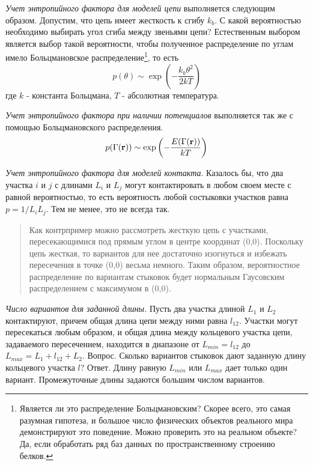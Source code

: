 \documentclass[tikz,a4paper]{scrartcl} %
\begin{document}
\textit{Учет энтропийного фактора для моделей цепи} выполняется следующим образом. Допустим, что цепь имеет жесткость к сгибу $k_b$. С какой вероятностью необходимо выбирать угол сгиба между звеньями цепи? Естественным выбором является выбор такой вероятности, чтобы полученное распределение по углам имело Больцмановское распределение\footnote{Является ли это распределение Больцмановским? Скорее всего, это самая разумная гипотеза, и большое число физических объектов реального мира демонстрируют это поведение. Можно проверить это на реальном объекте? Да, если обработать ряд баз данных по пространственному строению белков.}, то есть 
\[ p(\theta) \sim \exp \left(-\frac{k_b \theta^2}{2kT} \right)  \]
где $k$ - константа Больцмана, $T$ - абсолютная температура.

\textit{Учет энтропийного фактора при наличии потенциалов} выполняется так же с помощью Больцмановского распределения.
\[ p(\Gamma(\bold r)) \sim \exp\left(-\frac{E(\Gamma(\bold r))}{kT}\right)  \]

\textit{Учет энтропийного фактора для моделей контакта}. Казалось бы, что два участка $i$ и $j$ с длинами $L_i$ и $L_j$ могут контактировать в любом своем месте с равной вероятностью, то есть вероятность любой состыковки участков равна $p = 1 / L_i L_j$. Тем не менее, это не всегда так. 
\begin{quote} Как контрпример можно рассмотреть жесткую цепь с участками, пересекающимися под прямым углом в центре координат (0,0). Поскольку цепь жесткая, то вариантов для нее достаточно изогнуться и избежать пересечения в точке (0,0) весьма немного. Таким образом, вероятностное распределение по вариантам стыковок будет нормальным Гаусовским распределением с максимумом в (0,0).
\end{quote}

\textit{Число вариантов для заданной длины.} Пусть два участка длиной $L_1$ и $L_2$ контактируют, причем общая длина цепи между ними равна $l_{12}$. Участки могут пересекаться любым образом, и общая длина между кольцевого участка цепи, задаваемого пересечением, находится в диапазоне от $L_{min} = l_{12}$ до $L_{max} = L_1 + l_{12} + L_2$. Вопрос. Сколько вариантов стыковок дают заданную длину кольцевого участка $l$? Ответ. Длину равную $L_{min}$ или $L_{max}$ дает только один вариант. Промежуточные длины задаются большим числом вариантов. 
\end{document}
